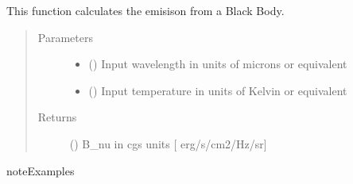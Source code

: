 \documentclass[a4paper,10pt,english]{sphinxmanual}
\begin{document}
\begin{fulllineitems}
\label{\detokenize{cascade.exoplanet_tools:cascade.exoplanet_tools.exoplanet_tools.Planck}}
This function calculates the emisison from a Black Body.
\begin{quote}\begin{description}
\item[{Parameters}] \leavevmode\begin{itemize}
\item {} 
 () \textendash{} Input wavelength in units of microns or equivalent

\item {} 
 () \textendash{} Input temperature in units of Kelvin or equivalent

\end{itemize}

\item[{Returns}] \leavevmode
{} () \textendash{} B\_nu in cgs units {[} erg/s/cm2/Hz/sr{]}

\end{description}\end{quote}

\begin{sphinxadmonition}{note}{Examples}

%
\begin{sphinxVerbatim}[commandchars=\\\{\}]
 
   
   
   
   
\end{sphinxVerbatim}


\end{sphinxadmonition}
\end{fulllineitems}
\end{document}
